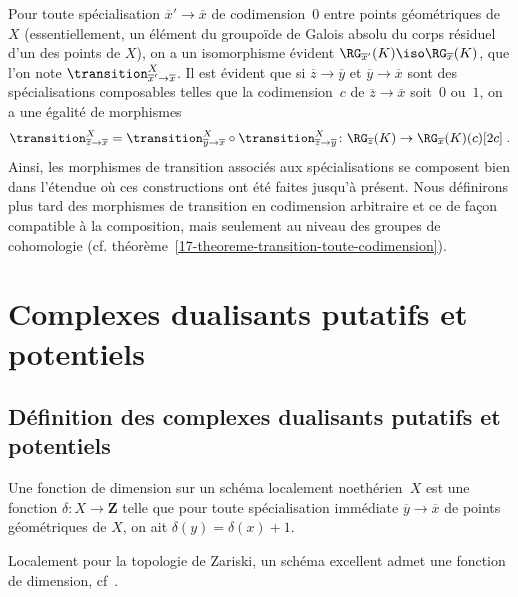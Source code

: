 \documentclass[10pt]{../fichiers-configuration-latex/smfart}
\begin{document}
\begin{remarque2}\label{17-remarque-composition-transition-codimension-0-ou-1}
Pour toute spécialisation $\overline x'\to\overline x$ de codimension $0$
entre points géométriques de $X$ (essentiellement, un élément du groupoïde
de Galois absolu du corps résiduel d'un des points de $X$), on a un
isomorphisme évident $\RG_{\overline x'}(K)\iso \RG_{\overline
x}(K)$, que l'on note $\transition^X_{\overline x'\to \overline x}$. Il est
évident que si $\overline z\to\overline y$ et $\overline y\to \overline x$
sont des spécialisations composables telles que la codimension $c$ de
$\overline z\to\overline x$ soit $0$ ou $1$, on a une égalité de morphismes
\[\transition^X_{\overline z\to\overline x}=\transition^X_{\overline y\to\overline
x}\circ \transition^X_{\overline z\to\overline y}\colon \RG_{\overline
z}(K)\to \RG_{\overline x}(K)(c)[2c]\;\text{.}\]
Ainsi, les morphismes de transition associés aux
spécialisations se composent bien dans l'étendue où ces constructions ont
été faites jusqu'à présent. Nous définirons plus tard des morphismes de
transition en codimension arbitraire et ce de façon compatible à la
composition, mais seulement au niveau des groupes de cohomologie
(cf. théorème~\ref{17-theoreme-transition-toute-codimension}).
\end{remarque2}

\section{Complexes dualisants putatifs et potentiels}%
\label{17-section-premieres-proprietes}
\subsection{Définition des complexes dualisants putatifs et potentiels}%

\begin{definition2}
\label{17-definition-fonction-de-dimension}
Une fonction de dimension sur un schéma localement
noethérien $X$ est une fonction $\delta\colon X\to\mathbf{Z}$ telle que
pour toute spécialisation immédiate $\overline y\to\overline x$ de points
géométriques de $X$, on ait $\delta(y)=\delta(x)+1$.
\end{definition2}

Localement pour la topologie de Zariski, un schéma excellent admet une
fonction de dimension, cf~.
\end{document}

